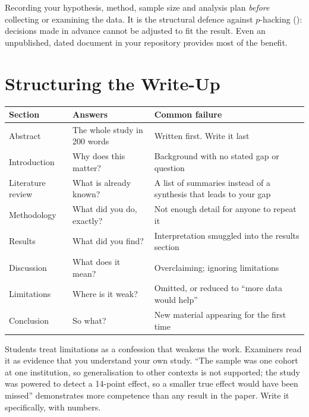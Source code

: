 \begin{definitionbox}
Recording your hypothesis, method, sample size and analysis plan \emph{before}
collecting or examining the data. It is the structural defence against $p$-hacking
(): decisions made in advance cannot be adjusted to fit the result.
Even an unpublished, dated document in your repository provides most of the benefit.
\end{definitionbox}

\section{Structuring the Write-Up}

\begin{longtable}{@{}L{2.7cm}L{4.4cm}L{6.9cm}@{}}
\toprule
{}
\textbf{Section} & \textbf{Answers} & \textbf{Common failure} \\
\midrule
\endhead
Abstract & The whole study in 200 words & Written first. Write it last \\
Introduction & Why does this matter? & Background with no stated gap or question \\
Literature review & What is already known? & A list of summaries instead of a synthesis that leads to your gap \\
Methodology & What did you do, exactly? & Not enough detail for anyone to repeat it \\
Results & What did you find? & Interpretation smuggled into the results section \\
Discussion & What does it mean? & Overclaiming; ignoring limitations \\
Limitations & Where is it weak? & Omitted, or reduced to ``more data would help'' \\
Conclusion & So what? & New material appearing for the first time \\
\bottomrule
\end{longtable}

\begin{conceptbox}
Students treat limitations as a confession that weakens the work. Examiners read it
as evidence that you understand your own study. ``The sample was one cohort at one
institution, so generalisation to other contexts is not supported; the study was
powered to detect a 14-point effect, so a smaller true effect would have been
missed'' demonstrates more competence than any result in the paper. Write it
specifically, with numbers.
\end{conceptbox}

